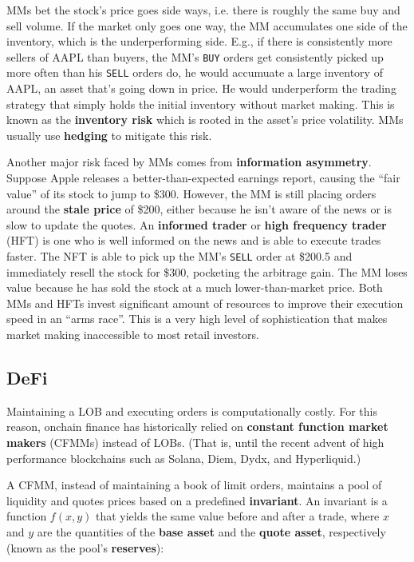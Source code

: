 \documentclass{article}
\begin{document}
MMs bet the stock's price goes side ways, i.e. there is roughly the same buy and sell volume. If the market only goes one way, the MM accumulates one side of the inventory, which is the underperforming side. E.g., if there is consistently more sellers of AAPL than buyers, the MM's \texttt{BUY} orders get consistently picked up more often than his \texttt{SELL} orders do, he would accumuate a large inventory of AAPL, an asset that's going down in price. He would underperform the trading strategy that simply holds the initial inventory without market making. This is known as the \textbf{inventory risk} which is rooted in the asset's price volatility. MMs usually use \textbf{hedging} to mitigate this risk.

Another major risk faced by MMs comes from \textbf{information asymmetry}. Suppose Apple releases a better-than-expected earnings report, causing the ``fair value'' of its stock to jump to \$300. However, the MM is still placing orders around the \textbf{stale price} of \$200, either because he isn't aware of the news or is slow to update the quotes. An \textbf{informed trader} or \textbf{high frequency trader} (HFT) is one who is well informed on the news and is able to execute trades faster. The NFT is able to pick up the MM's \texttt{SELL} order at \$200.5 and immediately resell the stock for \$300, pocketing the arbitrage gain. The MM loses value because he has sold the stock at a much lower-than-market price. Both MMs and HFTs invest significant amount of resources to improve their execution speed in an ``arms race''.\supercite{frequentbatchauctions} This is a very high level of sophistication that makes market making inaccessible to most retail investors.

\subsection{DeFi}

Maintaining a LOB and executing orders is computationally costly. For this reason, onchain finance has historically relied on \textbf{constant function market makers} (CFMMs) instead of LOBs. (That is, until the recent advent of high performance blockchains such as Solana, Diem, Dydx, and Hyperliquid.)

A CFMM, instead of maintaining a book of limit orders, maintains a pool of liquidity and quotes prices based on a predefined \textbf{invariant}. An invariant is a function $f(x, y)$ that yields the same value before and after a trade, where $x$ and $y$ are the quantities of the \textbf{base asset} and the \textbf{quote asset}, respectively (known as the pool's \textbf{reserves}):
\end{document}
